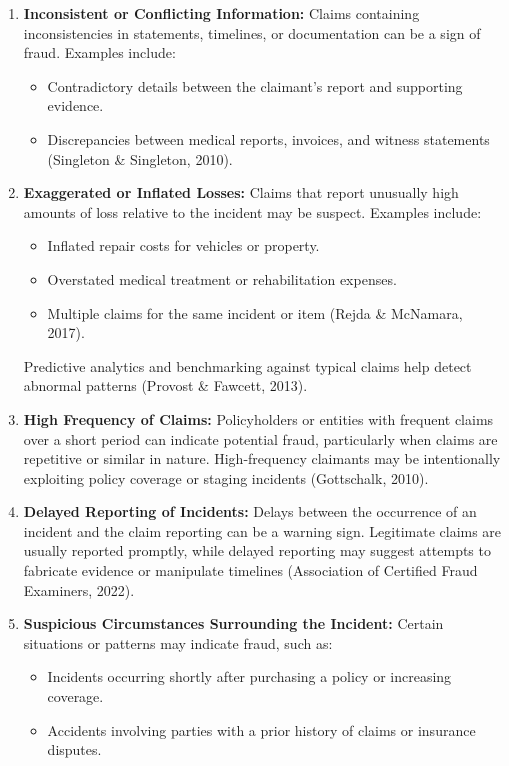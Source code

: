 \documentclass[12pt,a4paper]{article}
\begin{document}
\begin{enumerate}
    \item \textbf{Inconsistent or Conflicting Information:} Claims containing inconsistencies in statements, timelines, or documentation can be a sign of fraud. Examples include:
    \begin{itemize}
        \item Contradictory details between the claimant’s report and supporting evidence.
        \item Discrepancies between medical reports, invoices, and witness statements (Singleton \& Singleton, 2010).
    \end{itemize}
    \item \textbf{Exaggerated or Inflated Losses:} Claims that report unusually high amounts of loss relative to the incident may be suspect. Examples include:
    \begin{itemize}
        \item Inflated repair costs for vehicles or property.
        \item Overstated medical treatment or rehabilitation expenses.
        \item Multiple claims for the same incident or item (Rejda \& McNamara, 2017).
    \end{itemize}
    Predictive analytics and benchmarking against typical claims help detect abnormal patterns (Provost \& Fawcett, 2013).
    \item \textbf{High Frequency of Claims:} Policyholders or entities with frequent claims over a short period can indicate potential fraud, particularly when claims are repetitive or similar in nature. High-frequency claimants may be intentionally exploiting policy coverage or staging incidents (Gottschalk, 2010).
    \item \textbf{Delayed Reporting of Incidents:} Delays between the occurrence of an incident and the claim reporting can be a warning sign. Legitimate claims are usually reported promptly, while delayed reporting may suggest attempts to fabricate evidence or manipulate timelines (Association of Certified Fraud Examiners, 2022).
    \item \textbf{Suspicious Circumstances Surrounding the Incident:} Certain situations or patterns may indicate fraud, such as:
    \begin{itemize}
        \item Incidents occurring shortly after purchasing a policy or increasing coverage.
        \item Accidents involving parties with a prior history of claims or insurance disputes.

\end{itemize}
\end{enumerate}
\end{document}
